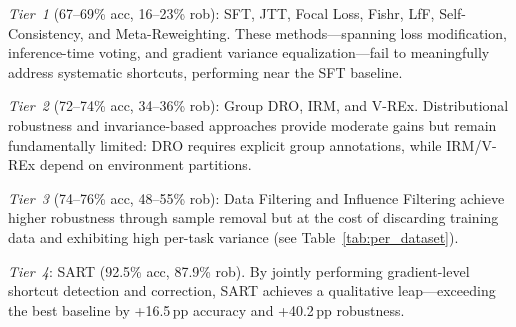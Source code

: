 \emph{Tier~1} (67--69\% acc, 16--23\% rob): SFT, JTT, Focal Loss, Fishr, LfF, Self-Consistency, and Meta-Reweighting. These methods---spanning loss modification, inference-time voting, and gradient variance equalization---fail to meaningfully address systematic shortcuts, performing near the SFT baseline.

\emph{Tier~2} (72--74\% acc, 34--36\% rob): Group DRO, IRM, and V-REx. Distributional robustness and invariance-based approaches provide moderate gains but remain fundamentally limited: DRO requires explicit group annotations, while IRM/V-REx depend on environment partitions.

\emph{Tier~3} (74--76\% acc, 48--55\% rob): Data Filtering and Influence Filtering achieve higher robustness through sample removal but at the cost of discarding training data and exhibiting high per-task variance (see Table~\ref{tab:per_dataset}).

\emph{Tier~4}: SART (92.5\% acc, 87.9\% rob). By jointly performing gradient-level shortcut detection and correction, SART achieves a qualitative leap---exceeding the best baseline by +16.5\,pp accuracy and +40.2\,pp robustness.

